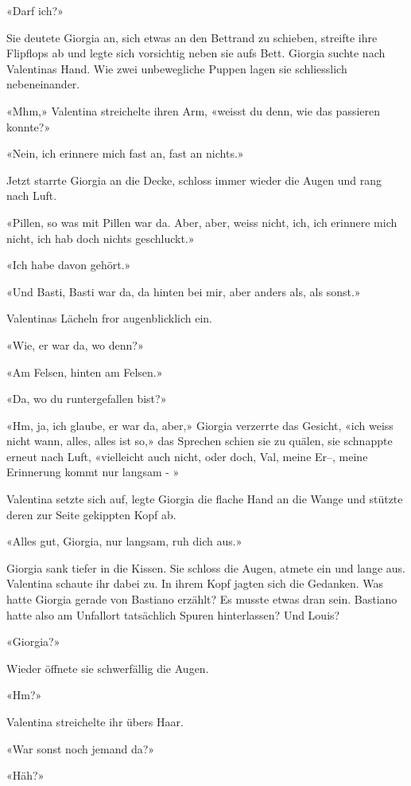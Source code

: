 «Darf ich?»

Sie deutete Giorgia an, sich etwas an den Bettrand zu schieben, streifte
ihre Flipflops ab und legte sich vorsichtig neben sie aufs Bett.
Giorgia suchte nach Valentinas Hand. Wie zwei unbewegliche Puppen lagen
sie schliesslich nebeneinander.

«Mhm,» Valentina streichelte ihren Arm, «weisst du denn, wie das
passieren konnte?»

«Nein, ich erinnere mich fast an, fast an nichts.»

Jetzt starrte Giorgia an die Decke, schloss immer wieder die Augen und
rang nach Luft.

«Pillen, so was mit Pillen war da. Aber, aber, weiss nicht, ich, ich
erinnere mich nicht, ich hab doch nichts geschluckt.»

«Ich habe davon gehört.»

«Und Basti, Basti war da, da hinten bei mir, aber anders als, als
sonst.»

Valentinas Lächeln fror augenblicklich ein.

«Wie, er war da, wo denn?»

«Am Felsen, hinten am Felsen.»

«Da, wo du runtergefallen bist?»

«Hm, ja, ich glaube, er war da, aber,» Giorgia verzerrte das Gesicht,
«ich weiss nicht wann, alles, alles ist so,» das Sprechen schien sie zu
quälen, sie schnappte erneut nach Luft, «vielleicht auch nicht, oder
doch, Val, meine Er–, meine Erinnerung kommt nur langsam - »

Valentina setzte sich auf, legte Giorgia die flache Hand an die Wange
und stützte deren zur Seite gekippten Kopf ab.

«Alles gut, Giorgia, nur langsam, ruh dich aus.»

Giorgia sank tiefer in die Kissen. Sie schloss die Augen, atmete ein
und lange aus. Valentina schaute ihr dabei zu. In ihrem Kopf jagten sich die Gedanken. Was hatte Giorgia
gerade von Bastiano erzählt? Es musste etwas dran sein. Bastiano hatte
also am Unfallort tatsächlich Spuren hinterlassen?
Und Louis?

«Giorgia?»

Wieder öffnete sie schwerfällig die Augen.

«Hm?»

Valentina streichelte ihr übers Haar.

«War sonst noch jemand da?»

«Häh?»

